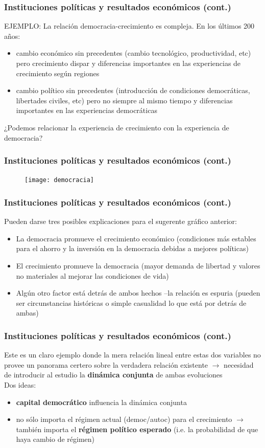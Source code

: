 \documentclass[handout,final,xcolor=dvipsnames]{beamer}
\begin{document}
\begin{frame}\frametitle{Instituciones políticas y resultados económicos (cont.)}
EJEMPLO: La relación democracia-crecimiento es compleja. En los últimos 200 años: \bigskip 
\begin{itemize} \itemsep 10pt
\item cambio económico sin precedentes (cambio tecnológico, productividad, etc) pero crecimiento dispar y diferencias importantes en las experiencias de crecimiento según
regiones
\item cambio político sin precedentes (introducción de condiciones democráticas, libertades civiles, etc) pero no siempre al mismo tiempo y diferencias importantes en las experiencias democráticas 
\end{itemize} \medskip 
¿Podemos relacionar la experiencia de crecimiento con la experiencia de democracia?
\end{frame}

\begin{frame} \frametitle{Instituciones políticas y resultados económicos (cont.)}
  \begin{figure}[htbp]
    \centering
    \texttt{[image: democracia]}
  \end{figure}
\end{frame}


\begin{frame} \frametitle{Instituciones políticas y resultados económicos (cont.)}
Pueden darse tres posibles explicaciones para el sugerente gráfico anterior: \bigskip 
\begin{itemize} \itemsep 10pt
\item La democracia promueve el crecimiento económico (condiciones más estables para
el ahorro y la inversión en la democracia debidas a mejores políticas)
\item El crecimiento promueve la democracia (mayor demanda de libertad y valores no
materiales al mejorar las condiciones de vida)
\item Algún otro factor está detrás de ambos hechos –la relación es espuria (pueden ser
circunstancias históricas o simple casualidad lo que está por detrás de ambas)
\end{itemize}
\end{frame}


\begin{frame} \frametitle{Instituciones políticas y resultados económicos (cont.)}
Este es un claro ejemplo donde la mera relación lineal entre estas dos variables no provee un panorama certero sobre la verdadera relación existente $\longrightarrow$ necesidad de introducir
al estudio la \textbf{dinámica conjunta} de ambas evoluciones \\  \medskip 
Dos ideas: \medskip 
\begin{itemize} \itemsep 10pt
\item \textbf{capital democrático} influencia la dinámica conjunta
\item no sólo importa el régimen actual (democ/autoc) para el crecimiento $\longrightarrow$ también importa el \textbf{régimen político esperado} (i.e. la probabilidad de que haya cambio
de régimen)
\end{itemize}
\end{frame}
\end{document}
